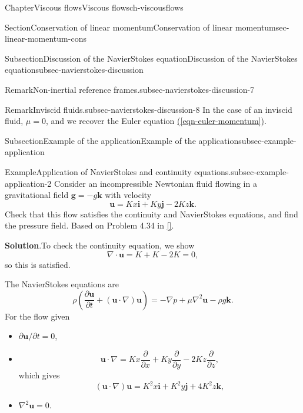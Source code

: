 \documentclass[oneside,10pt,]{book}
\newcommand{\blocktitlefont}{\relax}
\newcommand{\xreffont}{\relax}
\numberwithin{equation}{section}
\newcommand{\pd}[2]{\frac{\partial#1}{\partial#2}}
\newcommand{\bu}{\boldsymbol{u}}
\newcommand{\bg}{\boldsymbol{g}}
\newcommand{\bi}{\boldsymbol{i}}
\newcommand{\bj}{\boldsymbol{j}}
\newcommand{\bk}{\boldsymbol{k}}
\begin{document}
\begin{chapterptx}{Chapter}{Viscous flows}{}{Viscous flows}{}{}{ch-viscousflows}
\begin{sectionptx}{Section}{Conservation of linear momentum}{}{Conservation of linear momentum}{}{}{sec-linear-momentum-cons}
\begin{subsectionptx}{Subsection}{Discussion of the Navier\textendash{}Stokes equation}{}{Discussion of the Navier\textendash{}Stokes equation}{}{}{subsec-navierstokes-discussion}
\begin{remark}{Remark}{Non-inertial reference frames.}{subsec-navierstokes-discussion-7}
\end{remark}
\begin{remark}{Remark}{Inviscid fluids.}{subsec-navierstokes-discussion-8}%
In the case of an inviscid fluid, \(\mu=0\), and we recover the Euler equation \hyperref[eqn-euler-momentum]{({\xreffont\ref{eqn-euler-momentum}})}.%
\end{remark}
\end{subsectionptx}
%
%
\typeout{************************************************}
\typeout{************************************************}
%
\begin{subsectionptx}{Subsection}{Example of the application}{}{Example of the application}{}{}{subsec-example-application}
\begin{example}{Example}{Application of Navier\textendash{}Stokes and continuity equations.}{subsec-example-application-2}%
Consider an incompressible Newtonian fluid flowing in a gravitational field \(\bg=-g\bk\) with velocity%
\begin{equation*}
\bu=Kx\bi+Ky\bj-2Kz\bk.
\end{equation*}
Check that this flow satisfies the continuity and Navier\textendash{}Stokes equations, and find the pressure field. Based on Problem 4.34 in \hyperlink{ref-white-5}{[{\xreffont 9}]}.%
\par\smallskip%
\noindent\textbf{\blocktitlefont Solution}.\hypertarget{subsec-example-application-2-3}{}\quad{}To check the continuity equation, we show%
\begin{equation*}
\nabla\cdot\bu=K+K-2K=0,
\end{equation*}
so this is satisfied.%
\par
The Navier\textendash{}Stokes equations are%
\begin{equation*}
\rho\left(\pd{\bu}{t}
+(\bu\cdot\nabla)\bu\right)
=-\nabla p+\mu\nabla^2\bu-\rho g\bk.
\end{equation*}
For the flow given%
\begin{itemize}[label=\textbullet]
\item{}\(\partial\bu/\partial t=0\),%
\item{}%
\begin{equation*}
\bu\cdot\nabla=Kx\pd{}{x}+Ky\pd{}{y}-2Kz\pd{}{z},
\end{equation*}
which gives%
\begin{equation*}
(\bu\cdot\nabla)\bu=K^2x\bi+K^2y\bj+4K^2z\bk,
\end{equation*}
%
\item{}\(\nabla^2\bu=0\).%

\end{itemize}
\end{example}
\end{subsectionptx}
\end{sectionptx}
\end{chapterptx}
\end{document}

